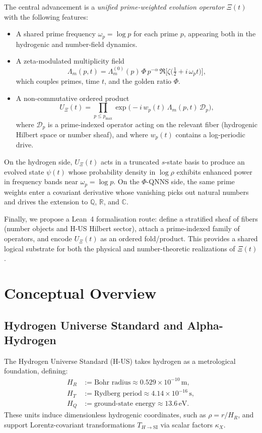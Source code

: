 \documentclass[11pt]{article}
\begin{document}
The central advancement is a \emph{unified prime-weighted evolution
operator} $\Xi(t)$ with the following features:
\begin{itemize}
  \item A shared prime frequency $\omega_p = \log p$ for each prime
  $p$, appearing both in the hydrogenic and number-field dynamics.

  \item A zeta-modulated multiplicity field
  \[
  \Lambda_m(p,t)
    = \Lambda_m^{(0)}(p)\,\Phi\,p^{-\alpha}
      \,\Re\bigl[\zeta\bigl(\tfrac12 + i\,\omega_p t\bigr)\bigr],
  \]
  which couples primes, time $t$, and the golden ratio $\Phi$.

  \item A non-commutative ordered product
  \[
  U_{\Xi}(t)
    = \prod_{p\le p_{\max}}
        \exp\bigl(-i\,w_p(t)\,\Lambda_m(p,t)\,\mathcal{D}_p\bigr),
  \]
  where $\mathcal{D}_p$ is a prime-indexed operator acting on the
  relevant fiber (hydrogenic Hilbert space or number sheaf), and where
  $w_p(t)$ contains a log-periodic drive.
\end{itemize}

On the hydrogen side, $U_{\Xi}(t)$ acts in a truncated $s$-state
basis to produce an evolved state $\psi(t)$ whose probability density
in $\log\rho$ exhibits enhanced power in frequency bands near
$\omega_p = \log p$. On the $\Phi$-QNNS side, the same prime weights
enter a covariant derivative whose vanishing picks out natural numbers
and drives the extension to $\mathbb{Q}$, $\mathbb{R}$, and
$\mathbb{C}$.

Finally, we propose a Lean~4 formalisation route: define a stratified
sheaf of fibers (number objects and H-US Hilbert sector), attach a
prime-indexed family of operators, and encode $U_{\Xi}(t)$ as an
ordered fold/product. This provides a shared logical substrate for
both the physical and number-theoretic realizations of $\Xi(t)$.

\section{Conceptual Overview}

\subsection{Hydrogen Universe Standard and Alpha-Hydrogen}

The Hydrogen Universe Standard (H-US) takes hydrogen as a metrological
foundation, defining:
\begin{align*}
  H_R &:= \text{Bohr radius} \approx 0.529\times10^{-10}\,\mathrm{m},\\
  H_T &:= \text{Rydberg period} \approx 4.14\times10^{-16}\,\mathrm{s},\\
  H_Q &:= \text{ground-state energy} \approx 13.6\,\mathrm{eV}.
\end{align*}
These units induce dimensionless hydrogenic coordinates, such as
\(\rho = r / H_R\), and support Lorentz-covariant transformations
$T_{H\to\mathrm{SI}}$ via scalar factors $\kappa_X$.
\end{document}
